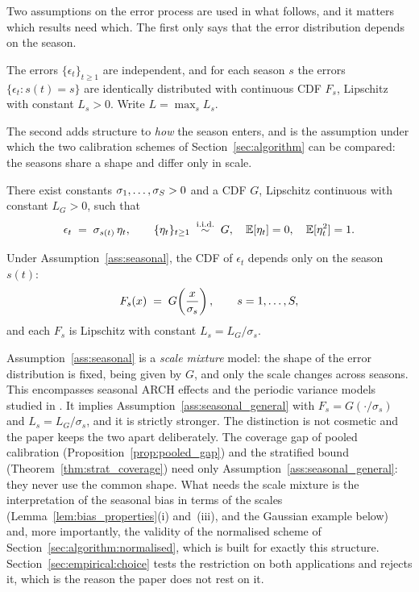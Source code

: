 Two assumptions on the error process are used in what follows, and it
matters which results need which.  The first only says that the error
distribution depends on the season.

\begin{assumption}
\label{ass:seasonal_general}
The errors $\{\epsilon_t\}_{t \geq 1}$ are independent, and for each
season $s$ the errors $\{\epsilon_t : s(t) = s\}$ are identically
distributed with continuous CDF $F_s$, Lipschitz with constant
$L_s > 0$.  Write $L = \max_s L_s$.
\end{assumption}

The second adds structure to \emph{how} the season enters, and is the
assumption under which the two calibration schemes of
Section~\ref{sec:algorithm} can be compared: the seasons share a shape
and differ only in scale.

\begin{assumption}
\label{ass:seasonal}
There exist constants $\sigma_1, \ldots, \sigma_S > 0$ and a
CDF $G$, Lipschitz continuous with constant $L_G > 0$, such that
\begin{equation}
  \label{eq:seasonal_model}
  \epsilon_t \;=\; \sigma_{s(t)}\,\eta_t,
  \qquad
  \{\eta_t\}_{t \geq 1} \;\overset{\mathrm{i.i.d.}}{\sim}\; G, \quad
  \mathbb{E}[\eta_t] = 0, \quad \mathbb{E}[\eta_t^2] = 1.
\end{equation}
\end{assumption}

Under Assumption~\ref{ass:seasonal}, the CDF of $\epsilon_t$ depends
only on the season $s(t)$:
\begin{equation}
  \label{eq:seasonal_cdf}
  F_s(x) \;=\; G\!\left(\frac{x}{\sigma_s}\right),
  \qquad s = 1, \ldots, S,
\end{equation}
and each $F_s$ is Lipschitz with constant $L_s = L_G/\sigma_s$.

\begin{remark}
Assumption~\ref{ass:seasonal} is a \emph{scale mixture} model: the
shape of the error distribution is fixed, being given by $G$, and
only the scale changes across seasons.  This encompasses seasonal
ARCH effects and the periodic variance models studied in
\citet{franses2004periodic}.  It implies
Assumption~\ref{ass:seasonal_general} with
$F_s = G(\cdot/\sigma_s)$ and $L_s = L_G/\sigma_s$, and it is strictly
stronger.  The distinction is not cosmetic and the paper keeps the two
apart deliberately.  The coverage gap of pooled calibration
(Proposition~\ref{prop:pooled_gap}) and the stratified bound
(Theorem~\ref{thm:strat_coverage}) need only
Assumption~\ref{ass:seasonal_general}: they never use the common
shape.  What needs the scale mixture is the interpretation of the
seasonal bias in terms of the scales
(Lemma~\ref{lem:bias_properties}(i) and~(iii), and the Gaussian example
below) and, more importantly, the validity of the normalised scheme of
Section~\ref{sec:algorithm:normalised}, which is built for exactly this
structure.  Section~\ref{sec:empirical:choice} tests the restriction on
both applications and rejects it, which is the reason the paper does not
rest on it.
\end{remark}

